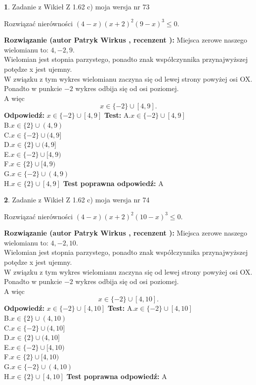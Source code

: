 \documentclass[12pt, a4paper]{article}
\theoremstyle{definition} %
\newtheorem{zad}{}
\newcommand{\zadStart}[1]{\begin{zad}#1\newline}
\newcommand{\zadStop}{\end{zad}}
\newcommand{\rozwStart}[2]{\noindent \textbf{Rozwiązanie (autor #1 , recenzent #2): }\newline}
\newcommand{\rozwStop}{\newline}
\newcommand{\odpStart}{\noindent \textbf{Odpowiedź:}\newline}
\newcommand{\odpStop}{\newline}
\newcommand{\testStart}{\noindent \textbf{Test:}\newline}
\newcommand{\testStop}{\newline}
\newcommand{\kluczStart}{\noindent \textbf{Test poprawna odpowiedź:}\newline}
\newcommand{\kluczStop}{\newline}
\begin{document}
\zadStart{Zadanie z Wikieł Z 1.62 c) moja wersja nr 73}

Rozwiązać nierówności $(4-x)(x+2)^{2}(9-x)^{3}\le0$.
\zadStop
\rozwStart{Patryk Wirkus}{}
Miejsca zerowe naszego wielomianu to: $4, -2, 9$.\\
Wielomian jest stopnia parzystego, ponadto znak współczynnika przy\linebreak najwyższej potędze x jest ujemny.\\ W związku z tym wykres wielomianu zaczyna się od lewej strony powyżej osi OX.\\
Ponadto w punkcie $-2$ wykres odbija się od osi poziomej.\\
A więc $$x \in \{-2\} \cup [4,9].$$
\rozwStop
\odpStart
$x \in \{-2\} \cup [4,9]$
\odpStop
\testStart
A.$x \in \{-2\} \cup [4,9]$\\
B.$x \in \{2\} \cup (4,9)$\\
C.$x \in \{-2\} \cup (4,9]$\\
D.$x \in \{2\} \cup (4,9]$\\
E.$x \in \{-2\} \cup [4,9)$\\
F.$x \in \{2\} \cup [4,9)$\\
G.$x \in \{-2\} \cup (4,9)$\\
H.$x \in \{2\} \cup [4,9]$
\testStop
\kluczStart
A
\kluczStop



\zadStart{Zadanie z Wikieł Z 1.62 c) moja wersja nr 74}

Rozwiązać nierówności $(4-x)(x+2)^{2}(10-x)^{3}\le0$.
\zadStop
\rozwStart{Patryk Wirkus}{}
Miejsca zerowe naszego wielomianu to: $4, -2, 10$.\\
Wielomian jest stopnia parzystego, ponadto znak współczynnika przy\linebreak najwyższej potędze x jest ujemny.\\ W związku z tym wykres wielomianu zaczyna się od lewej strony powyżej osi OX.\\
Ponadto w punkcie $-2$ wykres odbija się od osi poziomej.\\
A więc $$x \in \{-2\} \cup [4,10].$$
\rozwStop
\odpStart
$x \in \{-2\} \cup [4,10]$
\odpStop
\testStart
A.$x \in \{-2\} \cup [4,10]$\\
B.$x \in \{2\} \cup (4,10)$\\
C.$x \in \{-2\} \cup (4,10]$\\
D.$x \in \{2\} \cup (4,10]$\\
E.$x \in \{-2\} \cup [4,10)$\\
F.$x \in \{2\} \cup [4,10)$\\
G.$x \in \{-2\} \cup (4,10)$\\
H.$x \in \{2\} \cup [4,10]$
\testStop
\kluczStart
A
\kluczStop
\end{document}
